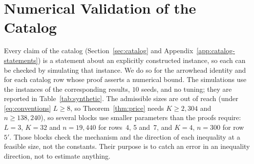 \documentclass[anon]{alt2027} %
\begin{document}
\section{Numerical Validation of the Catalog}
\label{app:synthetic}

Every claim of the catalog (Section~\ref{sec:catalog} and
Appendix~\ref{app:catalog-statements}) is a statement about an explicitly
constructed instance, so each can be checked by simulating that instance. We
do so for the arrowhead identity and for each catalog row whose proof asserts
a numerical bound. The simulations use the instances of the
corresponding results, $10$ seeds, and no tuning; they are reported in
Table~\ref{tab:synthetic}. The admissible sizes are out of reach (under
\eqref{eq:conventions} $L\ge8$, so Theorem~\ref{thm:price} needs $K\ge2{,}304$
and $n\ge138{,}240$), so several blocks use smaller parameters than the proofs
require: $L=3$, $K=32$ and $n=19{,}440$ for rows~4, 5 and~7, and $K=4$,
$n=300$ for row~$5'$. Those blocks check the mechanism and the direction of
each inequality at a feasible size, not the constants. Their purpose is to
catch an error in an inequality direction, not to estimate anything.
\end{document}
